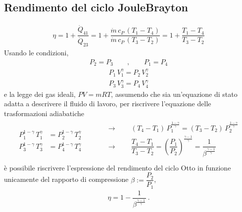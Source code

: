 \documentclass[letterpaper,10pt,italian]{jupyterBook}
\begin{document}
\subsection{Rendimento del ciclo Joule\sphinxhyphen{}Brayton}
\label{\detokenize{ch/thermodynamics/heat-engine-joule-brayton:rendimento-del-ciclo-joule-brayton}}\begin{equation*}
\begin{split}\eta = 1 + \dfrac{\dot{Q}_{41}}{\dot{Q}_{23}}
       = 1 + \dfrac{\dot{m} \, c_P \, (T_1 - T_4)}{\dot{m} \, c_P \, (T_3 - T_2)}
       = 1 + \dfrac{T_1 - T_4}{T_3 - T_2}
\end{split}
\end{equation*}
\sphinxAtStartPar
Usando le condizioni,  
\begin{equation*}
\begin{split}P_2 = P_3 \qquad , \qquad P_1 = P_4\end{split}
\end{equation*}\begin{equation*}
\begin{split}P_1 \, V_1^{\gamma} = P_2 \, V_2^{\gamma}\end{split}
\end{equation*}\begin{equation*}
\begin{split}P_3 \, V_3^{\gamma} = P_4 \, V_4^{\gamma}\end{split}
\end{equation*}
\sphinxAtStartPar
e la legge dei gas ideali, \(P V = m R T\), assumendo che sia un’equazione di stato adatta a descrivere il fluido di lavoro, per riscrivere l’equazione delle trasformazioni adiabatiche
\begin{equation*}
\begin{split}\begin{aligned}
  P_1^{1-\gamma} \, T_1^{\gamma} & = P_2^{1-\gamma} \, T_2^{\gamma} \\
  P_3^{1-\gamma} \, T_3^{\gamma} & = P_4^{1-\gamma} \, T_4^{\gamma}
\end{aligned}
\begin{aligned}
  & \qquad \rightarrow \qquad  (T_4 - T_1) \, P_1^{\frac{1-\gamma}{\gamma}} = (T_3 - T_2) \, P_2^{\frac{1-\gamma}{\gamma}} \\
  & \qquad \rightarrow \qquad  \dfrac{T_4 - T_1}{T_3 - T_2} = \left( \dfrac{P_1}{P_2} \right)^{\frac{\gamma-1}{\gamma}} = \dfrac{1}{\beta^{\frac{\gamma - 1}{\gamma}}} \\
\end{aligned}
\end{split}
\end{equation*}
\sphinxAtStartPar
è possibile riscrivere l’espressione del rendimento del ciclo Otto in funzione unicamente del rapporto di compressione \(\beta := \dfrac{P_2}{P_1}\),
\begin{equation*}
\begin{split}\eta = 1 - \dfrac{1}{\beta^{\frac{\gamma-1}{\gamma}}} \ .\end{split}
\end{equation*}
\end{document}
